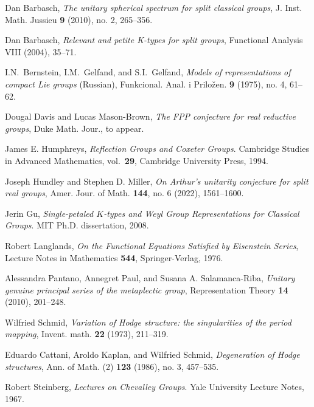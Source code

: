 \documentclass[12pt]{article}
\numberwithin{equation}{section}
\renewcommand\({\left(}
\renewcommand\){\right)}
\begin{document}
\begin{bibsection}
\begin{biblist}


Dan Barbasch, {\it The unitary spherical spectrum for split classical groups}, J. Inst. Math. Jussieu {\bf 9} (2010), no. 2, 265--356.

Dan Barbasch, {\it Relevant and petite K-types for split groups}, Functional Analysis VIII (2004), 35--71.

I.N.~Bernstein, I.M.~Gelfand, and S.I.~Gelfand, {\it
Models of representations of compact Lie groups} (Russian),
Funkcional. Anal. i Priložen. {\bf 9} (1975), no. 4, 61--62.


Dougal Davis and Lucas Mason-Brown, {\it The FPP conjecture for real reductive groups}, Duke Math. Jour., to appear.

James E. Humphreys,
\textit{Reflection Groups and Coxeter Groups}.
Cambridge Studies in Advanced Mathematics, vol.~{\bf 29}, Cambridge University Press, 1994.

 Joseph Hundley and  Stephen D. Miller,
{\it On Arthur’s unitarity conjecture for split real groups},
Amer. Jour. of Math. {\bf 144}, no. 6 (2022), 1561--1600.

Jerin Gu,
\textit{Single-petaled $K$-types and Weyl Group Representations for Classical Groups}.
MIT Ph.D. dissertation, 2008.

Robert Langlands,
\textit{On the Functional Equations Satisfied by Eisenstein Series}, Lecture Notes in Mathematics {\bf 544}, Springer-Verlag, 1976.

Alessandra Pantano, Annegret Paul, and  Susana A. Salamanca-Riba, {\it
Unitary genuine principal series of the metaplectic group},
Representation Theory {\bf 14} (2010), 201--248.

Wilfried Schmid, {\it
Variation of Hodge structure: the singularities of the period mapping},
Invent. math. {\bf 22} (1973), 211--319.

Eduardo
Cattani, Aroldo  Kaplan, and Wilfried Schmid, {\it
Degeneration of Hodge structures},
Ann. of Math. (2) {\bf 123} (1986), no. 3, 457--535.

Robert Steinberg,
\textit{Lectures on Chevalley Groups}.
Yale University Lecture Notes, 1967.



\end{biblist}
\end{bibsection}
\end{document}
